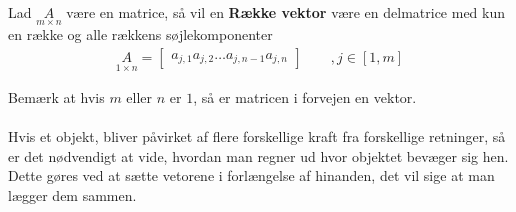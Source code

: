 \begin{defn}
Lad $\underset{m \times n}{A}$ være en matrice, så vil en \textbf{Række vektor} være en delmatrice med kun en række og alle rækkens søjlekomponenter
\begin{align*}
\underset{1 \times n}{A} = 
\begin{bmatrix}
a_{j,1} a_{j,2} \dots a_{j,n-1} a_{j,n}
\end{bmatrix}
\qquad , j\in [1,m]%
\end{align*}
\end{defn}
Bemærk at hvis $m$ eller $n$ er $1$, så er matricen i forvejen en vektor.\\
\\
Hvis et objekt, bliver påvirket af flere forskellige kraft fra forskellige retninger, så er det nødvendigt at vide, hvordan man regner ud hvor objektet bevæger sig hen. Dette gøres ved at sætte vetorene i forlængelse af hinanden, det vil sige at man lægger dem sammen.

